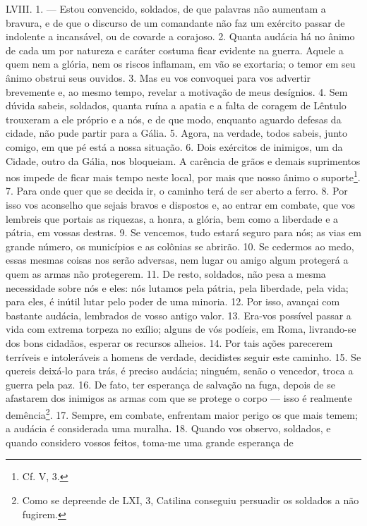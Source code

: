 LVIII. 1. --- Estou convencido, soldados, de que palavras não aumentam a
bravura, e de que o discurso de um comandante não faz um exército passar de
indolente a incansável, ou de covarde a corajoso. 2. Quanta audácia há no ânimo
de cada um por natureza e caráter costuma ficar evidente na guerra. Aquele a
quem nem a glória, nem os riscos inflamam, em vão se exortaria; o temor em seu
ânimo obstrui seus ouvidos. 3. Mas eu vos convoquei para vos advertir
brevemente e, ao mesmo tempo, revelar a motivação de meus desígnios. 4. Sem
dúvida sabeis, soldados, quanta ruína a apatia e a falta de coragem de Lêntulo
trouxeram a ele próprio e a nós, e de que modo, enquanto aguardo defesas da
cidade, não pude partir para a Gália. 5. Agora, na verdade, todos sabeis, junto
comigo, em que pé está a nossa situação. 6. Dois exércitos de inimigos, um da
Cidade, outro da Gália, nos bloqueiam. A carência de grãos e demais suprimentos
nos impede de ficar mais tempo neste local, por mais que nosso ânimo o
suporte\footnote{Cf. V, 3.}. 7. Para onde quer que se decida ir, o caminho terá
de ser aberto a ferro. 8. Por isso vos aconselho que sejais bravos e dispostos
e, ao entrar em combate, que vos lembreis que portais as riquezas, a honra, a
glória, bem como a liberdade e a pátria, em vossas destras. 9. Se vencemos,
tudo estará seguro para nós; as vias em grande número, os municípios e as
colônias se abrirão. 10. Se cedermos ao medo, essas mesmas coisas nos serão
adversas, nem lugar ou amigo algum protegerá a quem as armas não protegerem.
11. De resto, soldados, não pesa a mesma necessidade sobre nós e eles: nós
lutamos pela pátria, pela liberdade, pela vida; para eles, é inútil lutar pelo
poder de uma minoria. 12. Por isso, avançai com bastante audácia, lembrados de
vosso antigo valor. 13. Era-vos possível passar a vida com extrema torpeza no
exílio; alguns de vós podíeis, em Roma, livrando-se dos bons cidadãos, esperar
os recursos alheios. 14. Por tais ações parecerem terríveis e intoleráveis a
homens de verdade, decidistes seguir este caminho. 15. Se quereis deixá-lo para
trás, é preciso audácia; ninguém, senão o vencedor, troca a guerra pela paz.
16. De fato, ter esperança de salvação na fuga, depois de se afastarem dos
inimigos as armas com que se protege o corpo --- isso é realmente
demência\footnote{Como se depreende de LXI, 3, Catilina conseguiu persuadir os
soldados a não fugirem.}. 17. Sempre, em combate, enfrentam maior perigo os que
mais temem; a audácia é considerada uma muralha. 18. Quando vos observo,
soldados, e quando considero vossos feitos, toma-me uma grande esperança de
